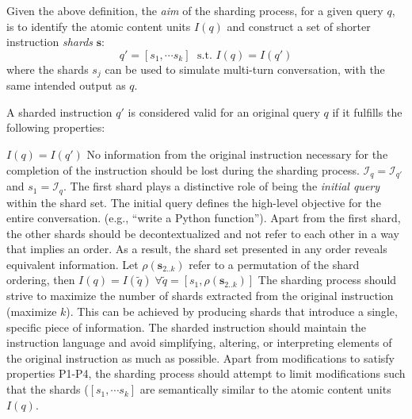 \documentclass{article}
\begin{document}
\begin{appendices}
Given the above definition, the {\em aim} of the sharding process, for a given query $q$, is to identify the atomic content units $I(q)$ and construct a set of shorter instruction {\em shards} $\mathbf{s}$:
\[ q' = [s_1, \cdots s_k] \; \mbox{ s.t. } I(q)=I(q')\]
where the shards $s_j$ can be used to simulate multi-turn conversation, with the same intended output as $q$.

A sharded instruction $q'$ is considered valid for an original query $q$ if it fulfills the following properties:

 $I(q)=I(q')$ No information from the original instruction necessary for the completion of the instruction should be lost during the sharding process.
 $\mathcal{I}_q=\mathcal{I}_{q'}$ and $s_1=\mathcal{I}_q$. The first shard plays a distinctive role of being the \textit{initial query} within the shard set. The initial query defines the high-level objective for the entire conversation. (e.g., ``write a Python function'').
 Apart from the first shard, the other shards should be decontextualized \cite{choi2021decontextualization} and not refer to each other in a way that implies an order. As a result, the shard set presented in any order reveals equivalent information. Let $\rho(\mathbf{s}_{2..k})$ refer to a permutation of the shard ordering, then $I(q)=I(\tilde{q}) \; \forall \tilde{q}=[s_1,\rho(\mathbf{s}_{2..k})]$
 The sharding process should strive to maximize the number of shards extracted from the original instruction (maximize $k$). This can be achieved by producing shards that introduce a single, specific piece of information.
 The sharded instruction should maintain the instruction language and avoid simplifying, altering, or interpreting elements of the original instruction as much as possible. Apart from modifications to satisfy properties P1-P4, the sharding process should attempt to limit modifications such that the shards ($[s_1, \cdots s_k]$ are semantically similar to the atomic content units $I(q)$.



\end{appendices}
\end{document}
